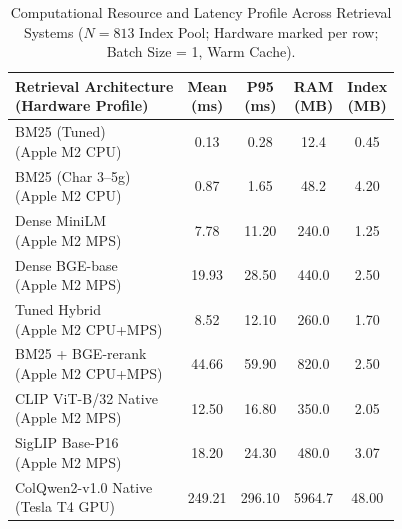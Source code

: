 \begin{table}[t]
\centering
\footnotesize
\caption{Computational Resource and Latency Profile Across Retrieval Systems ($N=813$ Index Pool; Hardware marked per row; Batch Size = 1, Warm Cache).}
\label{tab:system_costs}
\setlength{\tabcolsep}{2.5pt}
\begin{tabular}{@{}p{2.8cm}cccc@{}}
\toprule
\makecell[l]{\textbf{Retrieval Architecture}\\{\scriptsize \textbf{(Hardware Profile)}}} & \makecell{\textbf{Mean}\\\textbf{(ms)}} & \makecell{\textbf{P95}\\\textbf{(ms)}} & \makecell{\textbf{RAM}\\\textbf{(MB)}} & \makecell{\textbf{Index}\\\textbf{(MB)}} \\
\midrule
\makecell[l]{BM25 (Tuned)\\{\scriptsize (Apple M2 CPU)}}             & 0.13 & 0.28 & 12.4 & 0.45 \\
\makecell[l]{BM25 (Char 3--5g)\\{\scriptsize (Apple M2 CPU)}}        & 0.87 & 1.65 & 48.2 & 4.20 \\
\makecell[l]{Dense MiniLM\\{\scriptsize (Apple M2 MPS)}}             & 7.78 & 11.20 & 240.0 & 1.25 \\
\makecell[l]{Dense BGE-base\\{\scriptsize (Apple M2 MPS)}}           & 19.93 & 28.50 & 440.0 & 2.50 \\
\makecell[l]{Tuned Hybrid\\{\scriptsize (Apple M2 CPU+MPS)}}         & 8.52 & 12.10 & 260.0 & 1.70 \\
\makecell[l]{BM25 + BGE-rerank\\{\scriptsize (Apple M2 CPU+MPS)}}    & 44.66 & 59.90 & 820.0 & 2.50 \\
\makecell[l]{CLIP ViT-B/32 Native\\{\scriptsize (Apple M2 MPS)}}     & 12.50 & 16.80 & 350.0 & 2.05 \\
\makecell[l]{SigLIP Base-P16\\{\scriptsize (Apple M2 MPS)}}          & 18.20 & 24.30 & 480.0 & 3.07 \\
\makecell[l]{ColQwen2-v1.0 Native\\{\scriptsize (Tesla T4 GPU)}}     & 249.21 & 296.10 & 5964.7 & 48.00 \\
\bottomrule
\end{tabular}
\end{table}

